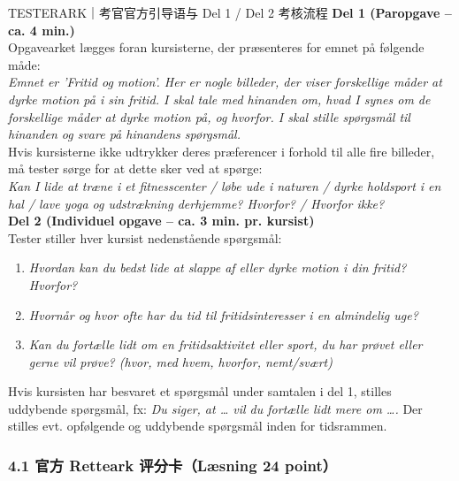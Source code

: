 \vspace{0.35em}
\begin{tipbox}{TESTERARK｜考官官方引导语与 Del 1 / Del 2 考核流程}
\small
\textbf{Del 1 (Paropgave -- ca. 4 min.)}\\
Opgavearket lægges foran kursisterne, der præsenteres for emnet på følgende måde:\\[3pt]
\textit{Emnet er 'Fritid og motion'. Her er nogle billeder, der viser forskellige måder at dyrke motion på i sin fritid. I skal tale med hinanden om, hvad I synes om de forskellige måder at dyrke motion på, og hvorfor. I skal stille spørgsmål til hinanden og svare på hinandens spørgsmål.}\\[4pt]
Hvis kursisterne ikke udtrykker deres præferencer i forhold til alle fire billeder, må tester sørge for at dette sker ved at spørge:\\[2pt]
\textit{Kan I lide at træne i et fitnesscenter / løbe ude i naturen / dyrke holdsport i en hal / lave yoga og udstrækning derhjemme? Hvorfor? / Hvorfor ikke?}\\[6pt]
\textbf{Del 2 (Individuel opgave -- ca. 3 min. pr. kursist)}\\
Tester stiller hver kursist nedenstående spørgsmål:
\begin{enumerate}[leftmargin=1.6em, itemsep=0.15em]
  \item \textit{Hvordan kan du bedst lide at slappe af eller dyrke motion i din fritid? Hvorfor?}
  \item \textit{Hvornår og hvor ofte har du tid til fritidsinteresser i en almindelig uge?}
  \item \textit{Kan du fortælle lidt om en fritidsaktivitet eller sport, du har prøvet eller gerne vil prøve? (hvor, med hvem, hvorfor, nemt/svært)}
\end{enumerate}
Hvis kursisten har besvaret et spørgsmål under samtalen i del 1, stilles uddybende spørgsmål, fx: \textit{Du siger, at \dots{} vil du fortælle lidt mere om \dots{}.} Der stilles evt. opfølgende og uddybende spørgsmål inden for tidsrammen.
\end{tipbox}


\subsubsection*{4.1 官方 Retteark 评分卡（Læsning 24 point）}

